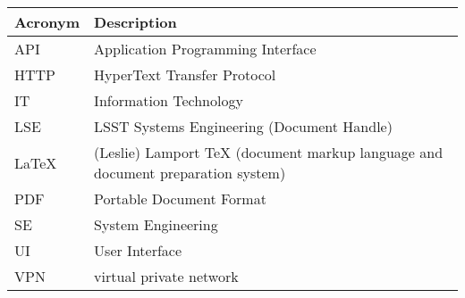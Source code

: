 \addtocounter{table}{-1}
\begin{longtable}{p{}p{}}\hline
\textbf{Acronym} & \textbf{Description}  \\\hline

API & Application Programming Interface \\\hline
HTTP & HyperText Transfer Protocol \\\hline
IT & Information Technology \\\hline
LSE & LSST Systems Engineering (Document Handle) \\\hline
LaTeX & (Leslie) Lamport TeX (document markup language and document preparation system) \\\hline
PDF & Portable Document Format \\\hline
SE & System Engineering \\\hline
UI & User Interface \\\hline
VPN & virtual private network \\\hline
\end{longtable}
